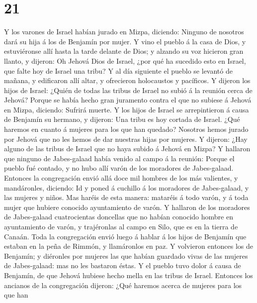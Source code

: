 \hypertarget{section-20}{%
\section{21}\label{section-20}}

 Y los varones de Israel habían jurado en Mizpa, diciendo:
Ninguno de nosotros dará su hija á los de Benjamín por mujer.
 Y vino el pueblo á la casa de Dios, y estuviéronse allí
hasta la tarde delante de Dios; y alzando su voz hicieron gran llanto, y
dijeron:  Oh Jehová Dios de Israel, ¿por qué ha sucedido
esto en Israel, que falte hoy de Israel una tribu?  Y al
día siguiente el pueblo se levantó de mañana, y edificaron allí altar, y
ofrecieron holocaustos y pacíficos.  Y dijeron los hijos
de Israel: ¿Quién de todas las tribus de Israel no subió á la reunión
cerca de Jehová? Porque se había hecho gran juramento contra el que no
subiese á Jehová en Mizpa, diciendo: Sufrirá muerte.  Y
los hijos de Israel se arrepintieron á causa de Benjamín su hermano, y
dijeron: Una tribu es hoy cortada de Israel.  ¿Qué haremos
en cuanto á mujeres para los que han quedado? Nosotros hemos jurado por
Jehová que no les hemos de dar nuestras hijas por mujeres.
 Y dijeron: ¿Hay alguno de las tribus de Israel que no
haya subido á Jehová en Mizpa? Y hallaron que ninguno de Jabes-galaad
había venido al campo á la reunión:  Porque el pueblo fué
contado, y no hubo allí varón de los moradores de Jabes-galaad.
 Entonces la congregación envió allá doce mil hombres de
los más valientes, y mandáronles, diciendo: Id y poned á cuchillo á los
moradores de Jabes-galaad, y las mujeres y niños.  Mas
haréis de esta manera: mataréis á todo varón, y á toda mujer que hubiere
conocido ayuntamiento de varón.  Y hallaron de los
moradores de Jabes-galaad cuatrocientas doncellas que no habían conocido
hombre en ayuntamiento de varón, y trajéronlas al campo en Silo, que es
en la tierra de Canaán.  Toda la congregación envió luego
á hablar á los hijos de Benjamín que estaban en la peña de Rimmón, y
llamáronlos en paz.  Y volvieron entonces los de
Benjamín; y diéronles por mujeres las que habían guardado vivas de las
mujeres de Jabes-galaad: mas no les bastaron éstas.  Y el
pueblo tuvo dolor á causa de Benjamín, de que Jehová hubiese hecho mella
en las tribus de Israel.  Entonces los ancianos de la
congregación dijeron: ¿Qué haremos acerca de mujeres para los que han
